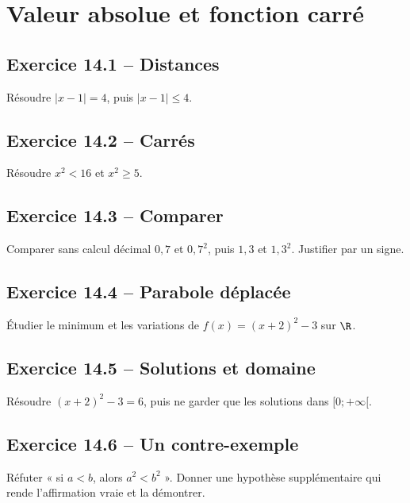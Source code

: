 \chapter{Valeur absolue et fonction carré}
\section*{Exercice 14.1 -- Distances}
Résoudre $|x-1|=4$, puis $|x-1|\leq4$.

\section*{Exercice 14.2 -- Carrés}
Résoudre $x^2<16$ et $x^2\geq5$.

\section*{Exercice 14.3 -- Comparer}
Comparer sans calcul décimal $0{,}7$ et $0{,}7^2$, puis $1{,}3$ et $1{,}3^2$. Justifier par un signe.

\section*{Exercice 14.4 -- Parabole déplacée}
Étudier le minimum et les variations de $f(x)=(x+2)^2-3$ sur $\R$.

\section*{Exercice 14.5 -- Solutions et domaine}
Résoudre $(x+2)^2-3=6$, puis ne garder que les solutions dans $[0;+\infty[$.

\section*{Exercice 14.6 -- Un contre-exemple}
Réfuter « si $a<b$, alors $a^2<b^2$ ». Donner une hypothèse supplémentaire qui rende l'affirmation vraie et la démontrer.
